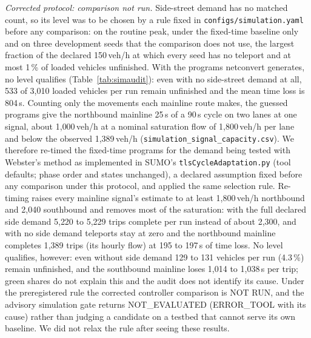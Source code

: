 \textit{Corrected protocol: comparison not run.} Side-street demand has no matched count, so its level was to be
chosen by a rule fixed in \texttt{configs/simulation.yaml} before any comparison: on the routine peak, under the
fixed-time baseline only and on three development seeds that the comparison does not use, the largest fraction of the
declared 150\,veh/h at which every seed has no teleport and at most 1\,\% of loaded vehicles unfinished. With the
programs netconvert generates, no level qualifies (Table~\ref{tab:simaudit}): even with no side-street demand at all,
533 of 3{,}010 loaded vehicles per run remain unfinished and the mean time loss is 804\,s. Counting only the movements
each mainline route makes, the guessed programs give the northbound mainline 25\,s of a 90\,s cycle on two lanes at
one signal, about 1{,}000\,veh/h at a nominal saturation flow of 1{,}800\,veh/h per lane and below the observed
1{,}389\,veh/h (\texttt{simulation\_signal\_capacity.csv}). We therefore re-timed the fixed-time programs for the
demand being tested with Webster's method as implemented in SUMO's \texttt{tlsCycleAdaptation.py} (tool defaults;
phase order and states unchanged), a declared assumption fixed before any comparison under this protocol, and
applied the same selection rule. Re-timing raises every mainline signal's estimate to at least 1{,}800\,veh/h
northbound and 2{,}040 southbound and removes most of the saturation: with the full declared side demand 5{,}220 to
5{,}229 trips complete per run instead of about 2{,}300, and with no side demand teleports stay at zero and the
northbound mainline completes 1{,}389 trips (its hourly flow) at 195 to 197\,s of time loss. No level qualifies, however: even
without side demand 129 to 131 vehicles per run (4.3\,\%) remain unfinished, and the southbound mainline loses 1{,}014
to 1{,}038\,s per trip; green shares do not explain this and the audit does not identify its cause. Under the
preregistered rule the corrected controller comparison is NOT RUN, and the advisory simulation gate returns
NOT\_EVALUATED (ERROR\_TOOL with its cause) rather than judging a candidate on a testbed that cannot serve its own
baseline. We did not relax the rule after seeing these results.

